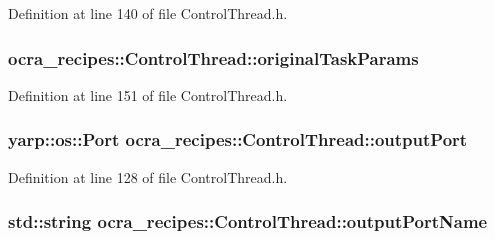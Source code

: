 Definition at line 140 of file Control\+Thread.\+h.

\subsubsection[{\texorpdfstring{original\+Task\+Params}{originalTaskParams}}]{ ocra\+\_\+recipes\+::\+Control\+Thread\+::original\+Task\+Params\hspace{0.3cm}{\ttfamily [protected]}}\hypertarget{classocra__recipes_1_1ControlThread_a352038d00d429ce8e1ef5defb88005cd}{}\label{classocra__recipes_1_1ControlThread_a352038d00d429ce8e1ef5defb88005cd}


Definition at line 151 of file Control\+Thread.\+h.

\subsubsection[{\texorpdfstring{output\+Port}{outputPort}}]{\setlength{\rightskip}{0pt plus 5cm}yarp\+::os\+::\+Port ocra\+\_\+recipes\+::\+Control\+Thread\+::output\+Port\hspace{0.3cm}{\ttfamily [protected]}}\hypertarget{classocra__recipes_1_1ControlThread_acf573eaf6f1d78918b95cabfb110bbaa}{}\label{classocra__recipes_1_1ControlThread_acf573eaf6f1d78918b95cabfb110bbaa}


Definition at line 128 of file Control\+Thread.\+h.

\subsubsection[{\texorpdfstring{output\+Port\+Name}{outputPortName}}]{\setlength{\rightskip}{0pt plus 5cm}std\+::string ocra\+\_\+recipes\+::\+Control\+Thread\+::output\+Port\+Name\hspace{0.3cm}{\ttfamily [protected]}}\hypertarget{classocra__recipes_1_1ControlThread_a150b524cf8af131ac4d7a497777a2d87}{}\label{classocra__recipes_1_1ControlThread_a150b524cf8af131ac4d7a497777a2d87}


